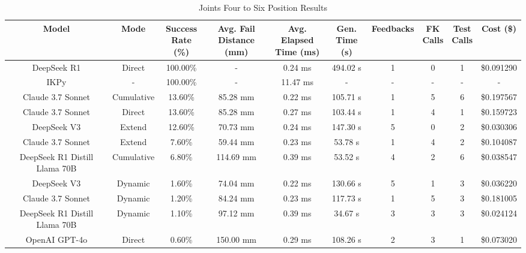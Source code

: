 \begin{landscape}
\begin{table}[H]
\tiny
\renewcommand{\arraystretch}{1.2}
\caption{Joints Four to Six Position Results}
\begin{center}
\begin{tabular}{|c|c|c|c|c|c|c|c|c|c|}
    \hline
    \textbf{Model} & 
    \textbf{Mode} & 
    \makecell{\textbf{Success}\\\textbf{Rate (\%)}} &
    \makecell{\textbf{Avg. Fail}\\\textbf{Distance (mm)}} &
    \makecell{\textbf{Avg. Elapsed}\\\textbf{Time (ms)}} &
    \makecell{\textbf{Gen.}\\\textbf{Time (s)}} &
    \textbf{Feedbacks} &
    \makecell{\textbf{FK}\\\textbf{Calls}} &
    \makecell{\textbf{Test}\\\textbf{Calls}} &
    \textbf{Cost (\$)} \\
    \hline
    DeepSeek R1 & Direct & 100.00\% & - & 0.24 ms & 494.02 s & 1 & 0 & 1 & \$0.091290 \\
    \hline
    IKPy & - & 100.00\% & - & 11.47 ms & - & - & - & - & - \\
    \hline
    Claude 3.7 Sonnet & Cumulative & 13.60\% & 85.28 mm & 0.22 ms & 105.71 s & 1 & 5 & 6 & \$0.197567 \\
    \hline
    Claude 3.7 Sonnet & Direct & 13.60\% & 85.28 mm & 0.27 ms & 103.44 s & 1 & 4 & 1 & \$0.159723 \\
    \hline
    DeepSeek V3 & Extend & 12.60\% & 70.73 mm & 0.24 ms & 147.30 s & 5 & 0 & 2 & \$0.030306 \\
    \hline
    Claude 3.7 Sonnet & Extend & 7.60\% & 59.44 mm & 0.23 ms & 53.78 s & 1 & 4 & 2 & \$0.104087 \\
    \hline
    DeepSeek R1 Distill Llama 70B & Cumulative & 6.80\% & 114.69 mm & 0.39 ms & 53.52 s & 4 & 2 & 6 & \$0.038547 \\
    \hline
    DeepSeek V3 & Dynamic & 1.60\% & 74.04 mm & 0.22 ms & 130.66 s & 5 & 1 & 3 & \$0.036220 \\
    \hline
    Claude 3.7 Sonnet & Dynamic & 1.20\% & 84.24 mm & 0.23 ms & 117.73 s & 1 & 5 & 3 & \$0.181005 \\
    \hline
    DeepSeek R1 Distill Llama 70B & Dynamic & 1.10\% & 97.12 mm & 0.39 ms & 34.67 s & 3 & 3 & 3 & \$0.024124 \\
    \hline
    OpenAI GPT-4o & Direct & 0.60\% & 150.00 mm & 0.29 ms & 108.26 s & 2 & 3 & 1 & \$0.073020 \\

\end{tabular}
\end{center}
\end{table}
\end{landscape}
